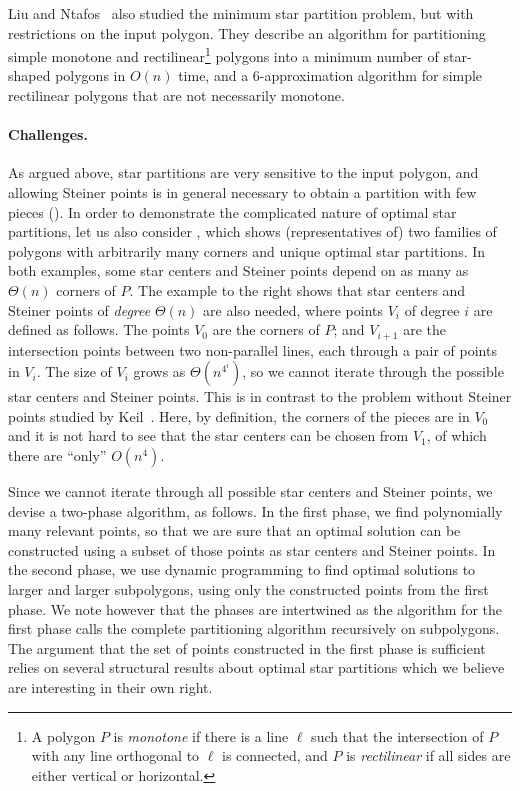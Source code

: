 \documentclass{theoretics}
\begin{document}
Liu and Ntafos~\cite{DBLP:journals/algorithmica/LiuN91} also studied the minimum star partition problem, but with restrictions on the input polygon. They describe an algorithm for partitioning simple monotone and rectilinear\footnote{A polygon $P$ is \emph{monotone} if there is a line $\ell$ such that the intersection of $P$ with any line orthogonal to $\ell$ is connected, and $P$ is \emph{rectilinear} if all sides are either vertical or horizontal.} polygons into a minimum number of star-shaped polygons in $O(n)$ time, and a $6$-approximation algorithm for simple rectilinear polygons that are not necessarily monotone.



\paragraph{Challenges.}
As argued above, star partitions are very sensitive to the input polygon, and allowing Steiner points is in general necessary to obtain a partition with few pieces (). In order to demonstrate the complicated nature of optimal star partitions, let us also consider , which shows (representatives of) two families of polygons with arbitrarily many corners and unique optimal star partitions.
In both examples, some star centers and Steiner points depend on as many as $\Theta(n)$ corners of $P$.
The example to the right shows that star centers and Steiner points of \emph{degree} $\Theta(n)$ are also needed, where points $V_i$ of degree $i$ are defined as follows.
The points $V_0$ are the corners of $P$; and $V_{i+1}$ are the intersection points between two non-parallel lines, each through a pair of points in $V_i$.
The size of $V_i$ grows as $\Theta(n^{4^i})$, so we cannot iterate through the possible star centers and Steiner points.
This is in contrast to the problem without Steiner points studied by Keil~\cite{DBLP:journals/siamcomp/Keil85}.
Here, by definition, the corners of the pieces are in $V_0$ and it is not hard to see that the star centers can be chosen from $V_1$, of which there are ``only'' $O(n^4)$.

Since we cannot iterate through all possible star centers and Steiner points, we devise a two-phase algorithm, as follows.
In the first phase, we find polynomially many relevant points, so that we are sure that an optimal solution can be constructed using a subset of those points as star centers and Steiner points.
In the second phase, we use dynamic programming to find optimal solutions to larger and larger subpolygons, using only the constructed points from the first phase.
We note however that the phases are intertwined as the algorithm for the first phase calls the complete partitioning algorithm recursively on subpolygons.
The argument that the set of points constructed in the first phase is sufficient relies on several structural results about optimal star partitions which we believe are interesting in their own right.
\end{document}
